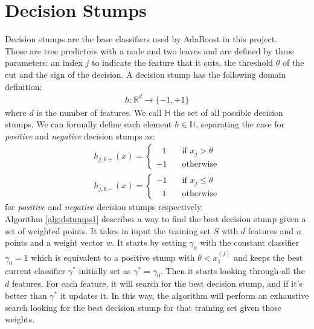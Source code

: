 
\chapter{Decision Stumps}
Decision stumps are the base classifiers used by AdaBoost in this project.\\
Those are tree predictors with a node and two leaves and are defined by three parameters: an index $j$ to indicate the feature that it cuts, the threshold $\theta$ of the cut and the sign of the decision. A decision stump has the following domain definition:
\begin{align}
\label{eq:dstumps_function}
	h:\mathbb{R}^d \to \lbrace-1, +1\rbrace
\end{align}
where $d$ is the number of features.
We call $\mathbb{H}$ the set of all  possible decision stumps. We can formally define each element $h \in \mathbb{H}$, separating the case for \textit{positive} and \textit{negative} decision stumps as:
\begin{align}
h_{j, \theta+}(x) =
\begin{cases}
\;\;\,1       & \quad \text{if } x_j > \theta\\
-1  & \quad \text{otherwise}
\end{cases}
\\
h_{j,\theta-}(x) =
\begin{cases}
-1			& \quad \text{if } x_j \leq \theta\\
\;\;\,1		& \quad \text{otherwise}
\end{cases}
\end{align}
for \textit{positive} and \textit{negative} decision stumps respectively.\\
Algorithm \ref{alg:dstumps1} describes a way to find the best decision stump given a set of weighted points. It takes in input the training set $S$ with $d$ features and $n$ points and a weight vector $w$. It starts by setting $\gamma_{0}$ with the constant classifier $\gamma_{0} = 1$ which is equivalent to a positive stump with $\theta < x_{1}^{(j)}$ and keeps the best current classifier $\gamma^{*}$ initially set as $\gamma^{*} = \gamma_{0}$. Then it starts looking through all the $d$ features. For each feature, it will search for the best decision stump, and if it's better than $\gamma^{*}$ it updates it. In this way, the algorithm will perform an exhaustive search looking for the best decision stump for that training set given those weights.
